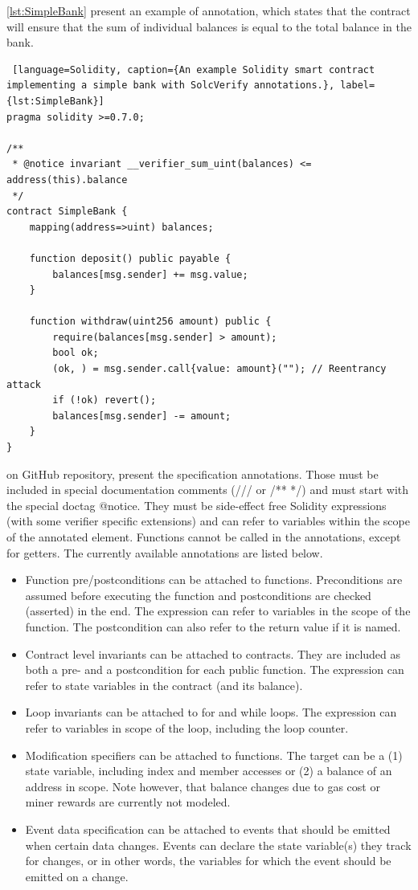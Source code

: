 \autoref{lst:SimpleBank} present an example of annotation, which states that the contract will ensure
that the sum of individual balances is equal to the total balance in the bank.


\begin{lstlisting} [language=Solidity, caption={An example Solidity smart contract implementing a simple bank with SolcVerify annotations.}, label={lst:SimpleBank}]
pragma solidity >=0.7.0;

/**
 * @notice invariant __verifier_sum_uint(balances) <= address(this).balance
 */
contract SimpleBank {
    mapping(address=>uint) balances;

    function deposit() public payable {
        balances[msg.sender] += msg.value;
    }

    function withdraw(uint256 amount) public {
        require(balances[msg.sender] > amount);
        bool ok;
        (ok, ) = msg.sender.call{value: amount}(""); // Reentrancy attack
        if (!ok) revert();
        balances[msg.sender] -= amount;
    }
}
\end{lstlisting}




\citet{SolcVerify_3} on GitHub repository, present the specification annotations. Those must be included in special documentation comments (/// or /** */) and must start with the special doctag @notice. 
They must be side-effect free Solidity expressions (with some verifier specific extensions) and can refer to variables within the scope of the annotated element. Functions cannot be called in the annotations, except for getters.
The currently available annotations are listed below. 

\begin{itemize}
    \item Function pre/postconditions can be attached to functions. Preconditions are assumed before executing the function and postconditions are checked (asserted) in the end. The expression can refer to variables in the scope of the function. The postcondition can also refer to the return value if it is named.
    \item Contract level invariants can be attached to contracts. They are included as both a pre- and a postcondition for each public function. The expression can refer to state variables in the contract (and its balance).
    \item Loop invariants can be attached to for and while loops. The expression can refer to variables in scope of the loop, including the loop counter.
    \item Modification specifiers can be attached to functions. The target can be a (1) state variable, including index and member accesses or (2) a balance of an address in scope. Note however, that balance changes due to gas cost or miner rewards are currently not modeled.
    \item Event data specification can be attached to events that should be emitted when certain data changes. 
    Events can declare the state variable(s) they track for changes, or in other words, the variables for which the event should be emitted on a change.
\end{itemize}

